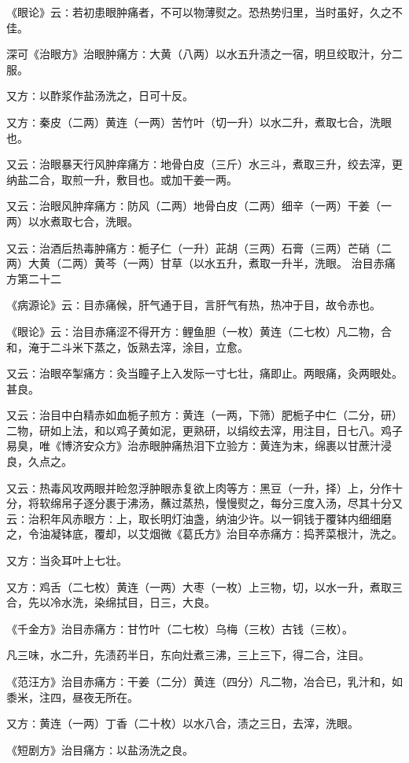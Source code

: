 \documentclass[a4paper,12pt,UTF8,twoside]{ctexbook}
\begin{document}
《眼论》云∶若初患眼肿痛者，不可以物薄熨之。恐热势归里，当时虽好，久之不佳。

深可《治眼方》治眼肿痛方∶大黄（八两）以水五升渍之一宿，明旦绞取汁，分二服。

又方∶以酢浆作盐汤洗之，日可十反。

又方∶秦皮（二两）黄连（一两）苦竹叶（切一升）以水二升，煮取七合，洗眼也。

又云∶治眼暴天行风肿痒痛方∶地骨白皮（三斤）水三斗，煮取三升，绞去滓，更纳盐二合，取煎一升，敷目也。或加干姜一两。

又云∶治眼风肿痒痛方∶防风（二两）地骨白皮（二两）细辛（一两）干姜（一两）以水煮取七合，洗眼。

又云∶治酒后热毒肿痛方∶栀子仁（一升）茈胡（三两）石膏（三两）芒硝（二两）大黄（二两）黄芩（一两）甘草（以水五升，煮取一升半，洗眼。
治目赤痛方第二十二

《病源论》云∶目赤痛候，肝气通于目，言肝气有热，热冲于目，故令赤也。

《眼论》云∶治目赤痛涩不得开方∶鲤鱼胆（一枚）黄连（二七枚）凡二物，合和，淹于二斗米下蒸之，饭熟去滓，涂目，立愈。

又云∶治眼卒掣痛方∶灸当瞳子上入发际一寸七壮，痛即止。两眼痛，灸两眼处。甚良。

又云∶治目中白精赤如血栀子煎方∶黄连（一两，下筛）肥栀子中仁（二分，研）二物，研如上法，和以鸡子黄如泥，更熟研，以绢绞去滓，用注目，日七八。鸡子易臭，唯《博济安众方》治赤眼肿痛热泪下立验方∶黄连为末，绵裹以甘蔗汁浸良，久点之。

又云∶热毒风攻两眼并睑忽浮肿眼赤复欲上肉等方∶黑豆（一升，择）上，分作十分，将软绵帛子逐分裹于沸汤，蘸过蒸热，慢慢熨之，每分三度入汤，尽其十分又云∶治积年风赤眼方∶上，取长明灯油盏，纳油少许。以一铜钱于覆钵内细细磨之，令油凝钵底，覆却，以艾烟微《葛氏方》治目卒赤痛方∶捣荠菜根汁，洗之。

又方∶当灸耳叶上七壮。

又方∶鸡舌（二七枚）黄连（一两）大枣（一枚）上三物，切，以水一升，煮取三合，先以冷水洗，染绵拭目，日三，大良。

《千金方》治目赤痛方∶甘竹叶（二七枚）乌梅（三枚）古钱（三枚）。

凡三味，水二升，先渍药半日，东向灶煮三沸，三上三下，得二合，注目。

《范汪方》治目赤痛方∶干姜（二分）黄连（四分）凡二物，冶合已，乳汁和，如黍米，注四，昼夜无所在。

又方∶黄连（一两）丁香（二十枚）以水八合，渍之三日，去滓，洗眼。

《短剧方》治目痛方∶以盐汤洗之良。
\end{document}
